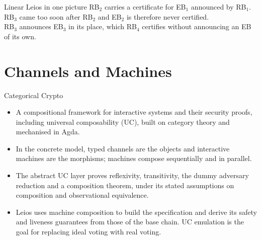 \documentclass[aspectratio=169,10pt]{beamer}
\begin{document}
\begin{frame}{Linear Leios in one picture}
  \vspace{2mm}
  \small RB$_2$ carries a certificate for EB$_1$ announced by RB$_1$.\\RB$_3$ came too soon after RB$_2$ and EB$_2$ is therefore never certified.\\RB$_3$ announces EB$_3$ in its place, which RB$_4$ certifies without announcing an EB of its own.
\end{frame}

\section{Channels and Machines}

\begin{frame}{Categorical Crypto}
  \begin{itemize}
    \item A compositional framework for interactive systems and their
          security proofs, including universal composability (UC), built on
          category theory and mechanised in Agda.
    \item In the concrete model, typed \alert{channels} are the objects and
          interactive \alert{machines} are the morphisms; machines compose
          sequentially and in parallel.
    \item The abstract UC layer proves reflexivity, transitivity, the dummy
          adversary reduction and a composition theorem, under its stated
          assumptions on composition and observational equivalence.
    \item Leios uses machine composition to build the specification and
          derive its safety and liveness guarantees from those of the base
          chain. UC emulation is the goal for replacing ideal voting with 
          real voting.
  \end{itemize}
\end{frame}
\end{document}
